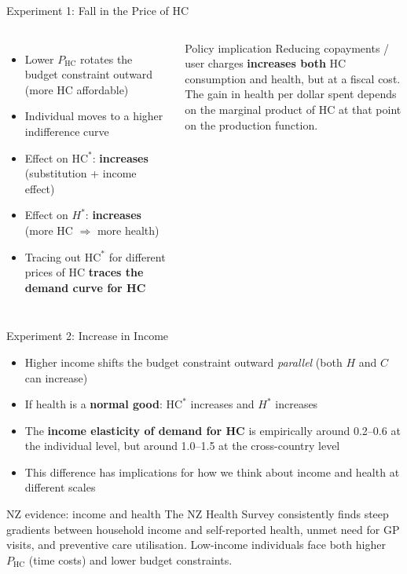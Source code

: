\documentclass[aspectratio=169, 12pt]{beamer}
\begin{document}
\begin{frame}{Experiment 1: Fall in the Price of HC}
  \begin{columns}
      \begin{itemize}
        \item Lower $P_\text{HC}$ rotates the budget constraint outward (more HC affordable)
        \item Individual moves to a higher indifference curve
        \item Effect on \textbf{$\text{HC}^*$}: \textcolor{OtagoBlue}{\textbf{increases}} (substitution + income effect)
        \item Effect on \textbf{$H^*$}: \textcolor{OtagoBlue}{\textbf{increases}} (more HC $\Rightarrow$ more health)
        \item Tracing out $\text{HC}^*$ for different prices of HC \textbf{traces the demand curve for HC}
      \end{itemize}
      \begin{alertblock}{Policy implication}
        Reducing copayments / user charges \textbf{increases both} HC consumption and health,
        but at a fiscal cost.\\[0.3em]
        The gain in health per dollar spent depends on the marginal product of HC at that point
        on the production function.
      \end{alertblock}
  \end{columns}
\end{frame}

\begin{frame}{Experiment 2: Increase in Income}
  \begin{itemize}
    \item Higher income shifts the budget constraint outward \emph{parallel} (both $H$ and $C$
          can increase)
    \item If health is a \textbf{normal good}: $\text{HC}^*$ increases and $H^*$ increases
    \item The \textbf{income elasticity of demand for HC} is empirically around 0.2--0.6 at
          the individual level, but around 1.0--1.5 at the cross-country level
    \item This difference has implications for how we think about income and health at different
          scales
  \end{itemize}
  \begin{exampleblock}{NZ evidence: income and health}
    The NZ Health Survey consistently finds steep gradients between household income and
    self-reported health, unmet need for GP visits, and preventive care utilisation.
    Low-income individuals face both higher $P_\text{HC}$ (time costs) and lower budget constraints.
  \end{exampleblock}
\end{frame}
\end{document}

